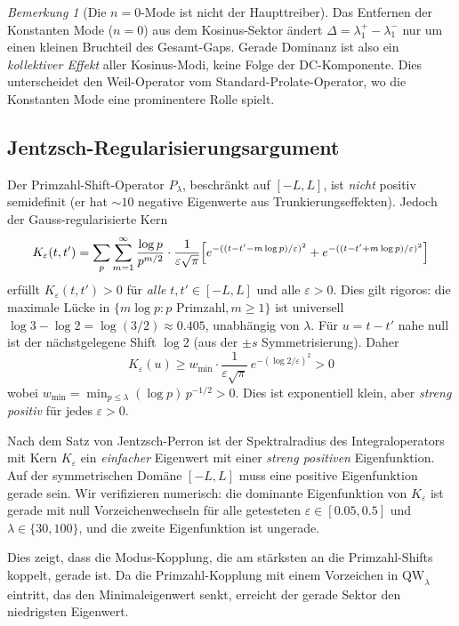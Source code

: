 ﻿\documentclass[12pt,a4paper]{article}
\theoremstyle{definition}
\theoremstyle{remark}
\newtheorem{remark}[theorem]{Bemerkung}
\begin{document}
\begin{remark}[Die $n=0$-Mode ist nicht der Haupttreiber]
Das Entfernen der Konstanten Mode ($n=0$) aus dem Kosinus-Sektor ändert $\Delta = \lambda_1^+ - \lambda_1^-$ nur um einen kleinen Bruchteil des Gesamt-Gaps. Gerade Dominanz ist also ein \emph{kollektiver Effekt} aller Kosinus-Modi, keine Folge der DC-Komponente. Dies unterscheidet den Weil-Operator vom Standard-Prolate-Operator, wo die Konstanten Mode eine prominentere Rolle spielt.
\end{remark}

\subsection{Jentzsch-Regularisierungsargument}

Der Primzahl-Shift-Operator $P_\lambda$, beschränkt auf $[-L,L]$, ist \emph{nicht} positiv semidefinit (er hat $\sim 10$ negative Eigenwerte aus Trunkierungseffekten). Jedoch der Gauss-regularisierte Kern
\[ K_\varepsilon(t,t') = \sum_p \sum_{m=1}^\infty \frac{\log p}{p^{m/2}} \cdot \frac{1}{\varepsilon\sqrt\pi} \Bigl[e^{-((t-t'-m\log p)/\varepsilon)^2} + e^{-((t-t'+m\log p)/\varepsilon)^2}\Bigr] \]
erfüllt $K_\varepsilon(t,t') > 0$ für \emph{alle} $t,t' \in [-L,L]$ und alle $\varepsilon > 0$. Dies gilt rigoros: die maximale Lücke in $\{m\log p : p\text{ Primzahl}, m \geq 1\}$ ist universell $\log 3 - \log 2 = \log(3/2) \approx 0.405$, unabhängig von $\lambda$. Für $u = t-t'$ nahe null ist der nächstgelegene Shift $\log 2$ (aus der $\pm s$ Symmetrisierung). Daher
\[ K_\varepsilon(u) \geq w_{\min} \cdot \frac{1}{\varepsilon\sqrt\pi}\, e^{-(\log 2/\varepsilon)^2} > 0 \]
wobei $w_{\min} = \min_{p \leq \lambda} (\log p)\, p^{-1/2} > 0$. Dies ist exponentiell klein, aber \emph{streng positiv} für jedes $\varepsilon > 0$.

Nach dem Satz von Jentzsch-Perron ist der Spektralradius des Integraloperators mit Kern $K_\varepsilon$ ein \emph{einfacher} Eigenwert mit einer \emph{streng positiven} Eigenfunktion. Auf der symmetrischen Domäne $[-L,L]$ muss eine positive Eigenfunktion gerade sein. Wir verifizieren numerisch: die dominante Eigenfunktion von $K_\varepsilon$ ist gerade mit null Vorzeichenwechseln für alle getesteten $\varepsilon \in [0.05, 0.5]$ und $\lambda \in \{30, 100\}$, und die zweite Eigenfunktion ist ungerade.

Dies zeigt, dass die Modus-Kopplung, die am stärksten an die Primzahl-Shifts koppelt, gerade ist. Da die Primzahl-Kopplung mit einem Vorzeichen in $\mathrm{QW}_\lambda$ eintritt, das den Minimaleigenwert senkt, erreicht der gerade Sektor den niedrigsten Eigenwert.
\end{document}
